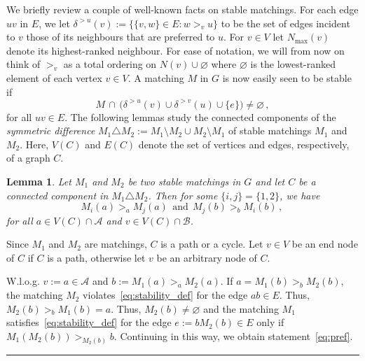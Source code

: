\documentclass[preprint]{elsarticle}
\newtheorem{lemma}[fact]{Lemma}
\newenvironment{proof}{{\bf Proof:  }}{\hfill\rule{2mm}{2mm}}
\newcommand{\cA}{\mathcal{A}} \newcommand{\cB}{\mathcal{B}}
\begin{document}
We briefly review a couple of well-known facts on stable matchings. 
For each edge $uv$ in $E$, we let
$\delta^{>u}(v):=\{ \{v,w\}\in E: w >_v u \}$ to be the set of edges
incident to $v$ those of its neighbours that are preferred to $u$. 
For $v \in V$ let $N_{\max}(v)$ denote its highest-ranked neighbour. 
For ease of notation, we will from now on think of $>_v$ as a total
ordering on $N(v) \cup \varnothing$ where 
$\varnothing$ is the lowest-ranked element of each vertex $v \in V$. 
A matching $M$ in $G$ is now easily seen to be stable if 
\begin{equation}\label{eq:stability_def}
		M \, \cap \, \big(\delta^{>u}(v) \cup \delta^{>v}(u) \cup  \{e\} \big)\neq\varnothing\,,
\end{equation}
for all $uv \in E$. The following lemmas study the connected components of
the {\em symmetric difference} $M_1\triangle M_2:=M_1\setminus M_2
\cup M_2 \setminus M_1$ of 
stable matchings $M_1$ and $M_2$. Here, $V(C)$ and $E(C)$ denote
the set of vertices and edges, respectively, of a graph $C$.

\begin{lemma}\label{lemma:pref}
Let $M_1$ and $M_2$ be two stable matchings in $G$ and let $C$ be a
connected component in $M_1 \triangle M_2$. Then for some
$\{i,j\}=\{1,2\}$, we have
\begin{equation}\label{eq:pref}
	M_i(a)>_a M_j(a) ~~\text{and} ~~  M_j(b)>_b M_i(b)\,,\,
\end{equation}
for all $a \in V(C) \cap \cA$ and $v \in V(C) \cap \cB$.
\end{lemma}
\begin{proof}
  Since $M_1$ and $M_2$ are matchings, $C$ is a path or a cycle. Let
  $v\in V$ be an end node of $C$ if $C$ is a path, otherwise let $v$
  be an arbitrary node of $C$.

  W.l.o.g. $v:=a\in \mathcal{A}$ and $b:=M_1(a) >_a M_2(a)$. If
  $a=M_1(b) >_b M_2(b)$, the matching $M_2$
  violates~\eqref{eq:stability_def} for the edge $ab\in E$. Thus,
  $M_2(b) >_b M_1(b)=a$. Thus, $M_2(b)\neq \varnothing$ and the
  matching $M_1$ satisfies~\eqref{eq:stability_def} for the edge
  $e:=bM_2(b)\in E$ only if $M_1(M_2(b))>_{M_2(b)} b$. Continuing
  in this way, we obtain statement~\eqref{eq:pref}.
\end{proof}
\end{document}
